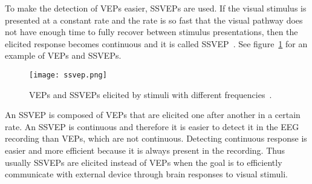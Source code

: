 To make the detection of \glspl{VEP} easier, \glspl{SSVEP} are used. If the visual stimulus is presented at a constant rate and the rate is so fast that the visual pathway does not have enough time to fully recover between stimulus presentations, then the elicited response becomes continuous and it is called \gls{SSVEP}~\cite{VEP}. See figure~\ref{fig:ssvep} for an example of \glspl{VEP} and \glspl{SSVEP}.

\begin{figure}[h!]
	\centering
	\texttt{[image: ssvep.png]}
	\caption{VEPs and SSVEPs elicited by stimuli with different frequencies~\cite[p.~259]{VEP}.}
	\label{fig:ssvep}
\end{figure}

An \gls{SSVEP} is composed of \glspl{VEP} that are elicited one after another in a certain rate. An \gls{SSVEP} is continuous and therefore it is easier to detect it in the \gls{EEG} recording than \glspl{VEP}, which are not continuous. Detecting continuous response is easier and more efficient because it is always present in the recording. Thus usually \glspl{SSVEP} are elicited instead of \glspl{VEP} when the goal is to efficiently communicate with external device through brain responses to visual stimuli. %





